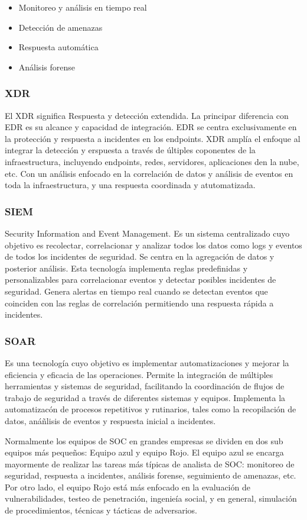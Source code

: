         \begin{itemize}
            \item Monitoreo y análisis en tiempo real
            \item Detección de amenazas
            \item Respuesta automática
            \item Análisis forense
        \end{itemize}

        \subsubsection{XDR} El XDR significa Respuesta y detección extendida. La principar diferencia con EDR es su alcance y capacidad de integración. EDR se centra exclusivamente en la protección y respuesta a incidentes en los endpoints. XDR amplía el enfoque al integrar la detección y erspuesta a través de últiples coponentes de la infraestructura, incluyendo endpoints, redes, servidores, aplicaciones den la nube, etc. Con un análisis enfocado en la correlación de datos y análisis de eventos en toda la infraestructura, y una respuesta coordinada y atutomatizada. 

        \subsubsection{SIEM} Security Information and Event Management. Es un sistema centralizado cuyo objetivo es recolectar, correlacionar y analizar todos los datos como logs y eventos de todos los incidentes de seguridad. Se centra en la agregación de datos y posterior análisis. Esta tecnología implementa reglas predefinidas y personalizables para correlacionar eventos y detectar posibles incidentes de seguridad. Genera alertas en tiempo real cuando se detectan eventos que coinciden con las reglas de correlación permitiendo una respuesta rápida a incidentes. 

        \subsubsection{SOAR} Es una tecnología cuyo objetivo es implementar automatizaciones y mejorar la eficiencia y eficacia de las operaciones. Permite la integración de múltiples herramientas y sistemas de seguridad, facilitando la coordinación de flujos de trabajo de seguridad a través de diferentes sistemas y equipos. Implementa la automatizacón de procesos repetitivos y rutinarios, tales como la recopilación de datos, anáñlisis de eventos y respuesta inicial a incidentes.

        Normalmente los equipos de SOC en grandes empresas se dividen en dos sub equipos más pequeños: Equipo azul y equipo Rojo.
        El equipo azul se encarga mayormente de realizar las tareas más típicas de analista de SOC: monitoreo de seguridad, respuesta a incidentes, análisis forense, seguimiento de amenazas, etc. Por otro lado, el equipo Rojo está más enfocado en la evaluación de vulnerabilidades, testeo de penetración, ingenieía social, y en general, simulación de procedimientos, técnicas y tácticas de adversarios. 






